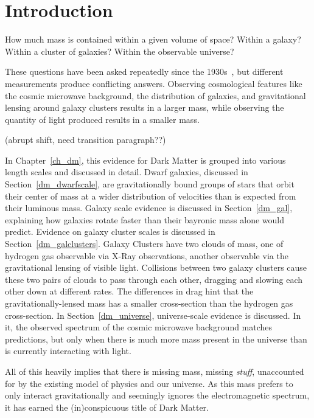 \cleartooddpage[\thispagestyle{empty}]
\chapter{Introduction}

  How much mass is contained within a given volume of space?
  Within a galaxy?
  Within a cluster of galaxies?
  Within the observable universe?

  These questions have been asked repeatedly since the 1930s~\cite{zwicky1937}, but different measurements produce conflicting answers.
  Observing cosmological features like the cosmic microwave background, the distribution of galaxies, and gravitational lensing around galaxy clusters results in a larger mass, while observing the quantity of light produced results in a smaller mass.
  
  {\color{red}(abrupt shift, need transition paragraph??)}

  In Chapter~\ref{ch_dm}, this evidence for Dark Matter is grouped into various length scales and discussed in detail.
  Dwarf galaxies, discussed in Section~\ref{dm_dwarfscale}, are gravitationally bound groups of stars that orbit their center of mass at a wider distribution of velocities than is expected from their luminous mass.
  Galaxy scale evidence is discussed in Section~\ref{dm_gal}, explaining how galaxies rotate faster than their bayronic mass alone would predict.
  Evidence on galaxy cluster scales is discussed in Section~\ref{dm_galclusters}.
  Galaxy Clusters have two clouds of mass, one of hydrogen gas observable via X-Ray observations, another observable via the gravitational lensing of visible light.
  Collisions between two galaxy clusters cause these two pairs of clouds to pass through each other, dragging and slowing each other down at different rates.
  The differences in drag hint that the gravitationally-lensed mass has a smaller cross-section than the hydrogen gas cross-section.
  In Section~\ref{dm_universe}, universe-scale evidence is discussed.
  In it, the observed spectrum of the cosmic microwave background matches predictions, but only when there is much more mass present in the universe than is currently interacting with light.

  All of this heavily implies that there is missing mass, missing \textit{stuff}, unaccounted for by the existing model of physics and our universe.
  As this mass prefers to only interact gravitationally and seemingly ignores the electromagnetic spectrum, it has earned the (in)conspicuous title of Dark Matter.

